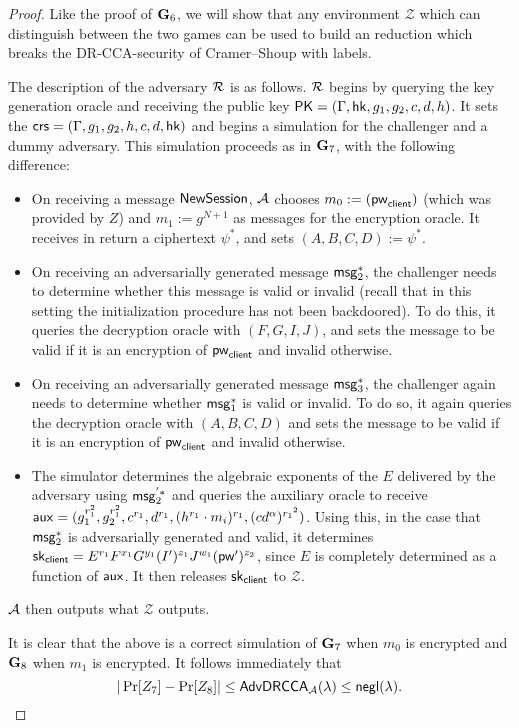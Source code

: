 \begin{proof}
	Like the proof of $\mathbf{G}_6$, we will show that any environment $\mathcal{Z}$ which can distinguish between the two games can be used to build an reduction which breaks the DR-CCA-security of Cramer--Shoup with labels.
	
	The description of the adversary $\mathcal{R}$ is as follows. $\mathcal{R}$ begins by querying the key generation oracle and receiving the public key $\mathsf{PK} = (\Gamma,\mathsf{hk},g_1,g_2,c,d,h)$. It sets the $\mathsf{crs} = (\Gamma,g_1,g_2,h,c,d,\mathsf{hk})$ and begins a simulation for the challenger and a dummy adversary. This simulation proceeds as in $\mathbf{G}_7$, with the following difference:
	
	\begin{itemize}
		\item On receiving a message $\mathsf{NewSession}$, $\mathcal{A}$ chooses $m_0:=(\mathsf{pw}_{\mathsf{client}})$ (which was provided by $Z$) and $m_1:=g^{N+1}$ as messages for the encryption oracle. It receives in return a ciphertext $\psi^{*}$, and sets $(A,B,C,D):=\psi^{*}$.
		\item On receiving an adversarially generated message $\mathsf{msg}_{2}^{*}$, the challenger needs to determine whether this message is valid or invalid (recall that in this setting the initialization procedure has not been backdoored). To do this, it queries the decryption oracle with $(F,G,I,J)$, and sets the message to be valid if it is an encryption of $\mathsf{pw}_{\mathsf{client}}$ and invalid otherwise.
		\item On receiving an adversarially generated message $\mathsf{msg}_{3}^{*}$, the challenger again needs to determine whether $\mathsf{msg}_{1}^{*}$ is valid or invalid. To do so, it again queries the decryption oracle with $(A,B,C,D)$ and sets the message to be valid if it is an encryption of $\mathsf{pw}_{\mathsf{client}}$ and invalid otherwise.
		\item The simulator determines the algebraic exponents of the $E$ delivered by the adversary using $\mathsf{msg}_{2}^{'*}$ and queries the auxiliary oracle to receive $\mathsf{aux} = (g_1^{r_1^2}, g_2^{r_1^2}, c^{r_1}, d^{r_1},(h^{r_1}\cdot m_i)^{r_1},(cd^{\alpha})^{{r_1}^2})$. Using this, in the case that $\mathsf{msg}_{2}^{*}$ is adversarially generated and valid, it determines $\mathsf{sk}_{\mathsf{client}} = E^{r_1}F^{x_1}G^{y_1}(I')^{z_1}J^{w_1}(\mathsf{pw}')^{z_2}$, since $E$ is completely determined as a function of $\mathsf{aux}$. It then releases $\mathsf{sk}_{\mathsf{client}}$ to $\mathcal{Z}$.
	\end{itemize}

	$\mathcal{A}$ then outputs what $\mathcal{Z}$ outputs.
	
	It is clear that the above is a correct simulation of $\mathbf{G}_7$ when $m_0$ is encrypted and $\mathbf{G}_8$ when $m_1$ is encrypted. It follows immediately that $$|\Pr[Z_7]-\Pr[Z_8]|\leq\mathsf{AdvDRCCA}_{\mathcal{A}}(\lambda)\leq\mathsf{negl}(\lambda).$$
\end{proof}

